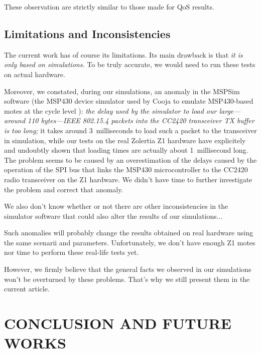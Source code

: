 \documentclass[a4paper,twoside]{article}
\begin{document}
These observation are strictly similar to those made for QoS results.



\subsection{Limitations and Inconsistencies}
\label{SectLimits}

The current work has of course its limitations. Its main drawback is that
\emph{it is only based on simulations.} To be truly accurate, we would need
to run these tests on actual hardware.

Moreover, we constated, during our simulations, an anomaly in the MSPSim
software (the MSP430 device simulator used by Cooja to emulate MSP430-based
motes at the cycle level \cite{MSPSim}): \emph{the delay used by the
simulator to load our large---around 110 bytes---IEEE 802.15.4 packets into
the CC2420 transceiver TX buffer is too long;} it takes around 3~milliseconds
to load such a packet to the transceiver in simulation, while our tests
on the real Zolertia Z1 hardware have explicitely and undoubtly shown that
loading times are actually about 1~millisecond long. The problem seems
to be caused by an overestimation of the delays caused by the operation
of the SPI bus that links the MSP430 microcontroller to the CC2420
radio transceiver on the Z1 hardware.
We didn't have time to further investigate the problem and correct
that anomaly.

We also don't know whether or not there are other inconsistencies in
the simulator software that could also alter the results of our
simulations...

Such anomalies will probably change the results obtained on real
hardware using the same scenarii and parameters. Unfortunately, we don't
have enough Z1 motes nor time to perform these real-life tests yet.

However, we firmly believe that the general facts we observed in our
simulations won't be overturned by these problems. That's why we still
present them in the current article.



\section{\uppercase{Conclusion and Future Works}}
\end{document}
